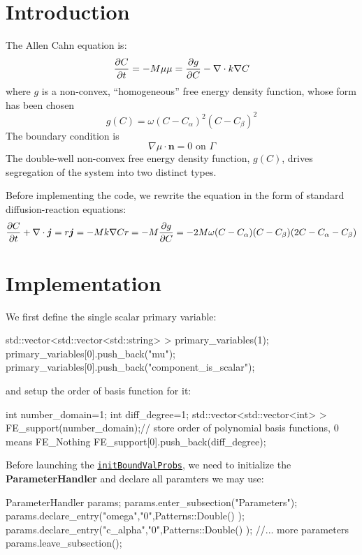 \hypertarget{growth_Introduction}{}\section{Introduction}\label{growth_Introduction}
The Allen Cahn equation is\-: \[ \frac{\partial C}{\partial t}=-M\mu\\ \mu=\frac{\partial g}{\partial C}-\nabla\cdot k\nabla C \] where $g$ is a non-\/convex, ``homogeneous'' free energy density function, whose form has been chosen \[ g(C)=\omega(C-C_\alpha)^2(C-C_\beta)^2 \] The boundary condition is \[ \nabla \mu\cdot\boldsymbol{n}=0 \text{ on }\Gamma \] The double-\/well non-\/convex free energy density function, $g(C)$, drives segregation of the system into two distinct types.

Before implementing the code, we rewrite the equation in the form of standard diffusion-\/reaction equations\-: \[ \frac{\partial C}{\partial t}+\nabla\cdot\boldsymbol{j}=r\\ \boldsymbol{j}=-Mk\nabla C\\ r=-M\frac{\partial g}{\partial C}=-2M\omega(C-C_\alpha)(C-C_\beta)(2C-C_\alpha-C_\beta) \]\hypertarget{growth_imple}{}\section{Implementation}\label{growth_imple}
We first define the single scalar primary variable\-: 
\begin{DoxyCode}
  std::vector<std::vector<std::string> > primary\_variables(1);        
primary\_variables[0].push\_back(\textcolor{stringliteral}{"mu"}); primary\_variables[0].push\_back(\textcolor{stringliteral}{"component\_is\_scalar"});
\end{DoxyCode}
 and setup the order of basis function for it\-: 
\begin{DoxyCode}
\textcolor{keywordtype}{int} number\_domain=1;
\textcolor{keywordtype}{int} diff\_degree=1;
std::vector<std::vector<int> > FE\_support(number\_domain);\textcolor{comment}{// store order of polynomial basis functions, 0
       means FE\_Nothing   }
FE\_support[0].push\_back(diff\_degree);
\end{DoxyCode}
 Before launching the \href{../html/classinit_bound_val_probs.html}{\tt init\-Bound\-Val\-Probs}, we need to initialize the {\bfseries Parameter\-Handler} and declare all paramters we may use\-: 
\begin{DoxyCode}
ParameterHandler params;
params.enter\_subsection(\textcolor{stringliteral}{"Parameters"});  
params.declare\_entry(\textcolor{stringliteral}{"omega"},\textcolor{stringliteral}{"0"},Patterns::Double() );
params.declare\_entry(\textcolor{stringliteral}{"c\_alpha"},\textcolor{stringliteral}{"0"},Patterns::Double() );
\textcolor{comment}{//... more parameters }
params.leave\_subsection();  
\end{DoxyCode}
